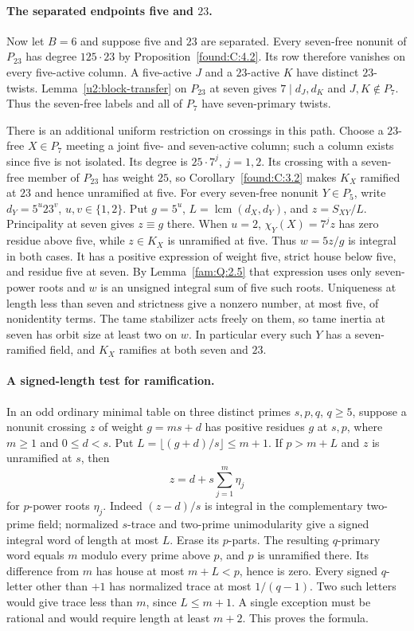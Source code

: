 \documentclass[11pt,a4paper]{article}
\numberwithin{equation}{section}
\theoremstyle{remark}
\begin{document}
\paragraph{The separated endpoints five and $23$.}
Now let $B=6$ and suppose five and $23$ are separated.
Every seven-free nonunit of $P_{23}$ has degree $125\cdot23$ by
Proposition~\ref{found:C:4.2}. Its row therefore vanishes on every five-active
column. A five-active $J$ and a $23$-active $K$ have distinct
$23$-twists. Lemma~\ref{u2:block-transfer} on $P_{23}$ at seven
gives $7\mid d_J,d_K$ and $J,K\notin P_7$. Thus the seven-free labels and all
of $P_7$ have seven-primary twists.

There is an additional uniform restriction on crossings in this path.
Choose a $23$-free $X\in P_7$ meeting a joint five- and seven-active
column; such a column exists since five is not isolated.
Its degree is $25\cdot7^j$, $j=1,2$. Its crossing with a
seven-free member of $P_{23}$ has weight $25$, so Corollary~\ref{found:C:3.2}
makes $K_X$ ramified at $23$ and hence unramified at five.
For every seven-free nonunit $Y\in P_5$, write $d_Y=5^u23^v$,
$u,v\in\{1,2\}$. Put $g=5^u$, $L=\operatorname{lcm}(d_X,d_Y)$,
and $z=S_{XY}/L$. Principality at seven gives $z\equiv g$ there.
When $u=2$, $\chi_Y(X)=7^j z$ has zero residue above five, while
$z\in K_X$ is unramified at five. Thus $w=5z/g$ is integral in
both cases. It has a positive expression of weight five, strict house
below five, and residue five at seven. By Lemma~\ref{fam:Q:2.5} that expression
uses only seven-power roots and $w$ is an unsigned integral sum of five
such roots. Uniqueness at length less than seven and strictness give a
nonzero number, at most five, of nonidentity terms. The tame stabilizer
acts freely on them, so tame inertia at seven has orbit size at least
two on $w$. In particular every such $Y$ has a seven-ramified field,
and $K_X$ ramifies at both seven and $23$.

\paragraph{A signed-length test for ramification.}
In an odd ordinary minimal table on three distinct primes $s,p,q$,
$q\ge5$, suppose a nonunit crossing $z$ of weight $g=ms+d$ has
positive residues $g$ at $s,p$, where $m\ge1$ and $0\le d<s$.
Put $L=\lfloor(g+d)/s\rfloor\le m+1$. If $p>m+L$ and $z$ is
unramified at $s$, then
\[
 z=d+s\sum_{j=1}^m\eta_j
\]
for $p$-power roots $\eta_j$. Indeed $(z-d)/s$ is integral in the
complementary two-prime field; normalized $s$-trace and two-prime
unimodularity give a signed integral word of length at most $L$.
Erase its $p$-parts. The resulting $q$-primary word equals $m$
modulo every prime above $p$, and $p$ is unramified there. Its
difference from $m$ has house at most $m+L<p$, hence is zero.
Every signed $q$-letter other than $+1$ has normalized trace at
most $1/(q-1)$. Two such letters would give trace less than $m$,
since $L\le m+1$. A single exception must be rational and would
require length at least $m+2$. This proves the formula.
\end{document}
